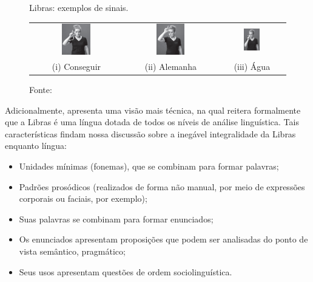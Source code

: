 \begin{figure}[htbp]
\centering
\caption{Libras: exemplos de sinais.}
\label{fig:libras-palavras}
\begin{tabular}{ccc} \includegraphics[width=0.331\textwidth]{images/libras-sinal-conseguir.png} &
\includegraphics[width=0.325\textwidth]{images/libras-sinal-alemanha.png} & \includegraphics[width=0.264\textwidth]{images/libras-sinal-agua.png} \\
(i) Conseguir & (ii) Alemanha & (iii) Água \\
\end{tabular}
\caption*{Fonte: }
\end{figure}

Adicionalmente,  apresenta uma visão mais técnica, na qual reitera formalmente que a Libras é uma língua dotada de todos os níveis de análise linguística. Tais características findam nossa discussão sobre a inegável integralidade da Libras enquanto língua:
\begin{itemize}
    \item Unidades mínimas (fonemas), que se combinam para formar palavras;
    \item Padrões prosódicos (realizados de forma não manual, por meio de expressões corporais ou faciais, por exemplo);
    \item Suas palavras se combinam para formar enunciados;
    \item Os enunciados apresentam proposições que podem ser analisadas do ponto de vista semântico, pragmático;
    \item Seus usos apresentam questões de ordem sociolinguística.
\end{itemize}


